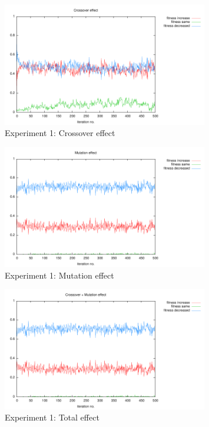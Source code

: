 \documentclass[12pt,a4paper]{article}
\begin{document}
\begin{figure}
\centering
\includegraphics[width=0.8\textwidth]{results/1/1-cs.pdf}
\caption{Experiment 1: Crossover effect}
\label{pic-e1-cs}
\end{figure}

\begin{figure}
\centering
\includegraphics[width=0.8\textwidth]{results/1/1-ms.pdf}
\caption{Experiment 1: Mutation effect}
\label{pic-e1-ms}
\end{figure}

\begin{figure}
\centering
\includegraphics[width=0.8\textwidth]{results/1/1-cms.pdf}
\caption{Experiment 1: Total effect}
\label{pic-e1-cms}
\end{figure}
\end{document}
